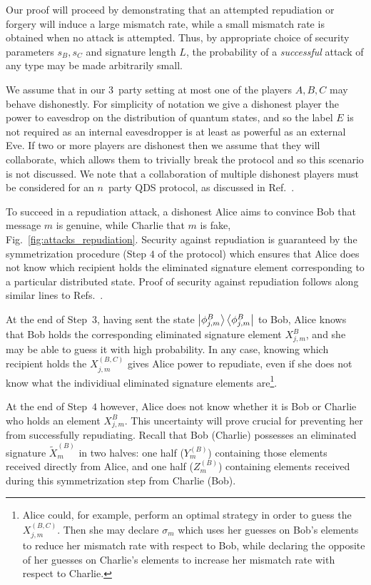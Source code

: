 Our proof will proceed by demonstrating that an attempted repudiation or forgery will induce a large mismatch rate, while a small mismatch rate is obtained when no attack is attempted. Thus, by appropriate choice of security parameters $s_B, s_C$ and signature length $L$, the probability of a \emph{successful} attack of any type may be made arbitrarily small. 

We assume that in our $3$~party setting at most one of the players $A, B, C$ may behave dishonestly. For simplicity of notation we give a dishonest player the power to eavesdrop on the distribution of quantum states, and so the label $E$ is not required as an internal eavesdropper is at least as powerful as an external Eve. If two or more players are dishonest then we assume that they will collaborate, which allows them to trivially break the protocol and so this scenario is not discussed. We note that a collaboration of multiple dishonest players must be considered for an $n$~party QDS protocol, as discussed in Ref.~\cite{Arrazola2016}.

To succeed in a repudiation attack, a dishonest Alice aims to convince Bob that message $m$ is genuine, while Charlie that $m$ is fake, Fig.~\ref{fig:attacks_repudiation}. Security against repudiation is guaranteed by the symmetrization procedure (Step $4$ of the protocol) which ensures that Alice does not know which recipient holds the eliminated signature element corresponding to a particular distributed state. Proof of security against repudiation follows along similar lines to Refs.~\cite{Dunjko2014, Wallden2015, Donaldson2016, Croal2016, Thornton2019}.

At the end of Step~$3$, having sent the state $\ket{\phi_{j, m}^B}\bra{\phi_{j, m}^B}$ to Bob, Alice knows that Bob holds the corresponding eliminated signature element $X_{j, m}^B$, and she may be able to guess it with high probability. In any case, knowing which recipient holds the $X_{j, m}^{\left(B, C\right)}$ gives Alice power to repudiate, even if she does not know what the individiual eliminated signature elements are\footnote{Alice could, for example, perform an optimal strategy in order to guess the $X_{j, m}^{\left(B, C\right)}$. Then she may declare $\sigma_m$ which uses her guesses on Bob's elements to reduce her mismatch rate with respect to Bob, while declaring the opposite of her guesses on Charlie's elements to increase her mismatch rate with respect to Charlie.}.

At the end of Step~$4$ however, Alice does not know whether it is Bob or Charlie who holds an element $X_{j, m}^B$. This uncertainty will prove crucial for preventing her from successfully repudiating. Recall that Bob  (Charlie) possesses an eliminated signature $\tilde{X}_m^{\left(B\right)}$ in two halves: one half ($Y_m^{\left(B\right)}$) containing those elements received directly from Alice, and one half ($Z_m^{\left(B\right)}$) containing elements received during this symmetrization step from Charlie (Bob).

